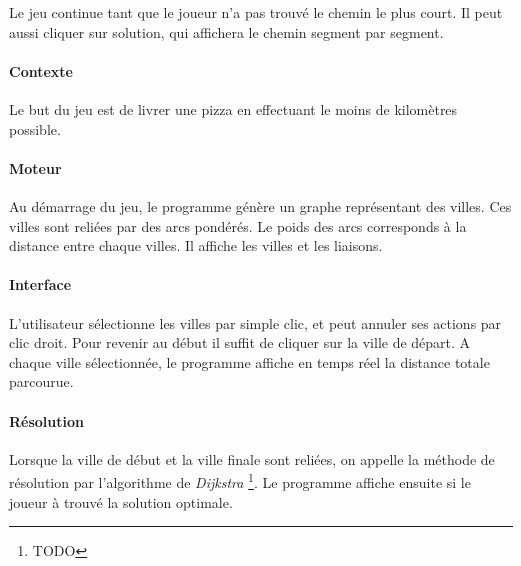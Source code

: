         Le jeu continue tant que le joueur n'a pas trouvé le chemin
        le plus court. Il peut aussi cliquer sur \og solution\fg, qui
        affichera le chemin segment par segment.

        \paragraph{Contexte}
            Le but du jeu est de livrer une pizza en effectuant le moins de kilomètres possible.
        \paragraph{Moteur}
            Au démarrage du jeu, le programme génère un graphe
            représentant des villes. Ces villes sont reliées par des arcs pondérés.
            Le poids des arcs corresponds à la distance entre chaque villes.
            Il affiche les villes et les liaisons.

        \paragraph{Interface}
            L'utilisateur sélectionne les villes par simple clic,
            et peut annuler ses actions par clic droit.
            Pour revenir au début il suffit de cliquer sur la ville de départ.
            A chaque ville sélectionnée, le programme
            affiche en temps réel la distance totale parcourue.

        \paragraph{Résolution}
            Lorsque la ville de début et la ville finale sont reliées,
            on appelle la méthode de résolution par l'algorithme de \emph{Dijkstra}
            \footnote{TODO}.
            Le programme affiche ensuite si le joueur à trouvé la solution optimale.

